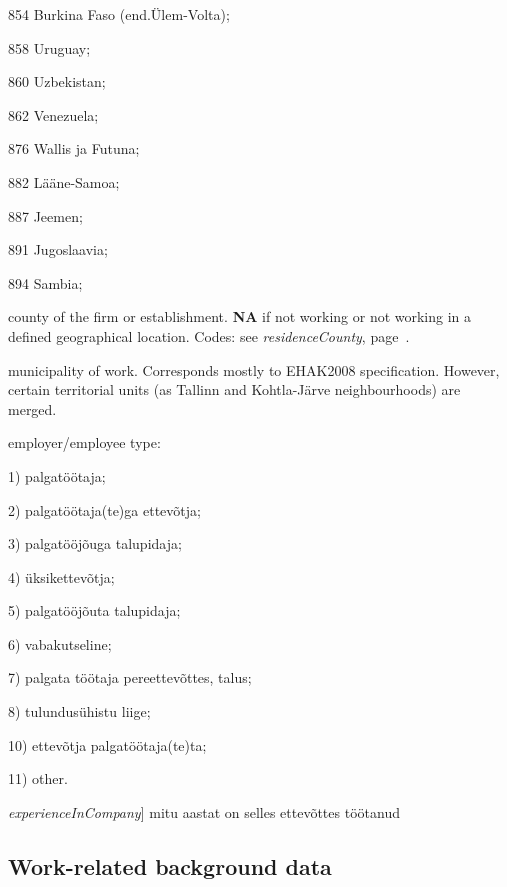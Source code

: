 \documentclass[a4paper]{article}
\newcommand{\NA}{\textbf{NA}\xspace}
\begin{document}
\begin{description}
\begin{inparaitem}
    \item[854] Burkina Faso (end.Ülem-Volta);
    \item[858] Uruguay;
    \item[860] Uzbekistan;
    \item[862] Venezuela;
    \item[876] Wallis ja Futuna;
    \item[882] Lääne-Samoa;
    \item[887] Jeemen;
    \item[891] Jugoslaavia;
    \item[894] Sambia;
  \end{inparaitem}
\item[workCounty] county of the firm or establishment.  \NA if not
  working or not working in a defined geographical location.  Codes:
  see \emph{residenceCounty}, page~\pageref{item:residenceCounty}.
\item[workMuni] municipality of work.  Corresponds mostly to EHAK2008
  specification.  However, certain territorial units (as Tallinn and
  Kohtla-Järve neighbourhoods) are merged.  
\item[employeeStatus] employer/employee type:
  \begin{inparaitem}
  \item[1)] palgatöötaja;
  \item[2)] palgatöötaja(te)ga ettevõtja;
  \item[3)] palgatööjõuga talupidaja;
  \item[4)] üksikettevõtja;
  \item[5)] palgatööjõuta talupidaja;
  \item[6)] vabakutseline;
  \item[7)] palgata töötaja pereettevõttes, talus;
  \item[8)] tulundusühistu liige;
  \item[10)] ettevõtja palgatöötaja(te)ta;
  \item[11)] other.
  \end{inparaitem}
\item[töökogemus ettevõttes] \textit{experienceInCompany}] mitu aastat on selles
ettevõttes töötanud
\end{description}


\subsection{Work-related background data}
\end{document}
